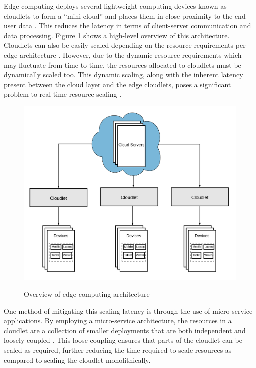 Edge computing deploys several lightweight computing devices known as cloudlets to form a ``mini-cloud'' and places them in close proximity to the end-user data \cite{liu2019survey}. This reduces the latency in terms of client-server communication and data processing. Figure \ref{fig:edge-architecture-overview} shows a high-level overview of this architecture. Cloudlets can also be easily scaled depending on the resource requirements per edge architecture \cite{ren2019survey}. However, due to the dynamic resource requirements which may fluctuate from time to time, the resources allocated to cloudlets must be dynamically scaled too. This dynamic scaling, along with the inherent latency present between the cloud layer and the edge cloudlets, poses a significant problem to real-time resource scaling \cite{varghese2016challenges}.\par

\begin{figure}[htb]
    \centering
    \caption{Overview of edge computing architecture}
    \includegraphics[width=0.9\linewidth]{Figures/Edge-Architecture-Overview.png}
    \label{fig:edge-architecture-overview}
\end{figure}

One method of mitigating this scaling latency is through the use of micro-service applications. By employing a micro-service architecture, the resources in a cloudlet are a collection of smaller deployments that are both independent and loosely coupled \cite{villamizar2015evaluating}. This loose coupling ensures that parts of the cloudlet can be scaled as required, further reducing the time required to scale resources as compared to scaling the cloudlet monolithically.\par

